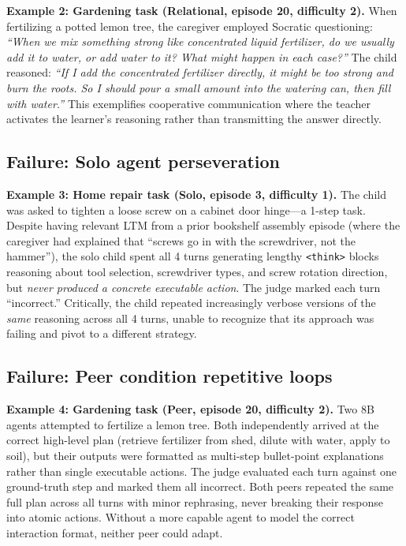 \documentclass{article}
\begin{document}
\textbf{Example 2: Gardening task (Relational, episode 20, difficulty 2).} When fertilizing a potted lemon tree, the caregiver employed Socratic questioning: \emph{``When we mix something strong like concentrated liquid fertilizer, do we usually add it to water, or add water to it? What might happen in each case?''} The child reasoned: \emph{``If I add the concentrated fertilizer directly, it might be too strong and burn the roots. So I should pour a small amount into the watering can, then fill with water.''} This exemplifies cooperative communication where the teacher activates the learner's reasoning rather than transmitting the answer directly.

\subsection{Failure: Solo agent perseveration}

\textbf{Example 3: Home repair task (Solo, episode 3, difficulty 1).} The child was asked to tighten a loose screw on a cabinet door hinge---a 1-step task. Despite having relevant LTM from a prior bookshelf assembly episode (where the caregiver had explained that ``screws go in with the screwdriver, not the hammer''), the solo child spent all 4 turns generating lengthy \texttt{<think>} blocks reasoning about tool selection, screwdriver types, and screw rotation direction, but \emph{never produced a concrete executable action}. The judge marked each turn ``incorrect.'' Critically, the child repeated increasingly verbose versions of the \emph{same} reasoning across all 4 turns, unable to recognize that its approach was failing and pivot to a different strategy.

\subsection{Failure: Peer condition repetitive loops}

\textbf{Example 4: Gardening task (Peer, episode 20, difficulty 2).} Two 8B agents attempted to fertilize a lemon tree. Both independently arrived at the correct high-level plan (retrieve fertilizer from shed, dilute with water, apply to soil), but their outputs were formatted as multi-step bullet-point explanations rather than single executable actions. The judge evaluated each turn against one ground-truth step and marked them all incorrect. Both peers repeated the same full plan across all turns with minor rephrasing, never breaking their response into atomic actions. Without a more capable agent to model the correct interaction format, neither peer could adapt.
\end{document}

